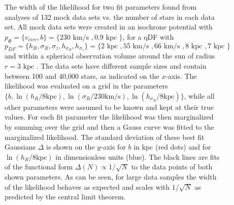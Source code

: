 \documentclass[12pt,preprint]{aastex}
\begin{document}
\begin{figure}
\caption{The width of the likelihood for two fit parameters found from analyses of 132 mock data sets vs. the number of stars in each data set. All mock data sets were created in an isochrone potential with $p_\Phi = \{v_{circ},b \}=\{230 \text{ km/s },0.9\text{ kpc } \}$, for a qDF with $p_{DF} = \{ h_R, \sigma_R, \sigma_z,h_{\sigma_R},h_{\sigma_z}\} =\{2 \text{ kpc }, 55 \text{ km/s }, 66 \text{ km/s }, 8 \text{ kpc }, 7 \text{ kpc }\} $ and within a spherical observation volume around the sun of radius $r = 3 \text{ kpc }$. The data sets have different sample sizes and contain between 100 and 40,000 stars, as indicated on the $x$-axis. The likelihood was evaluated on a grid in the parameters $\{b,\ln(h_R/8\text{kpc}),\ln(\sigma_{R}/230 \text{km/s}),\ln(h_{\sigma_R}/8\text{kpc}) \}$, while all other parameters were assumed to be known and kept at their true values. For each fit parameter the likelihood was then marginalized by summing over the grid and then a Gauss curve was fitted to the marginalized likelihood. The standard deviation of these best fit Gaussians $\Delta$ is shown on the $y$-axis for $b$ in kpc (red dots) and for $\ln(h_R/8\text{kpc})$ in dimensionless units (blue). The black lines are fits of the functional form $\Delta(N) \propto 1/\sqrt{N}$ to the data points  of both shown parameters. As can be seen, for large data samples the width of the likelihood behaves as expected and scales with $1/\sqrt{N}$ as predicted by the central limit theorem.} 
\end{figure}

\end{document}

